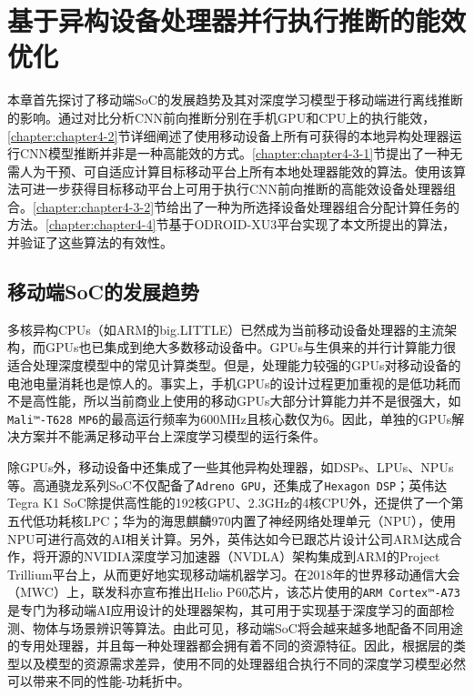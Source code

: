 \chapter{基于异构设备处理器并行执行推断的能效优化}
\label{chapter:chapter4}

本章首先探讨了移动端SoC的发展趋势及其对深度学习模型于移动端进行离线推断的影响。通过对比分析CNN前向推断分别在手机GPU和CPU上的执行能效，\ref{chapter:chapter4-2}节详细阐述了使用移动设备上所有可获得的本地异构处理器运行CNN模型推断并非是一种高能效的方式。\ref{chapter:chapter4-3-1}节提出了一种无需人为干预、可自适应计算目标移动平台上所有本地处理器能效的算法。使用该算法可进一步获得目标移动平台上可用于执行CNN前向推断的高能效设备处理器组合。\ref{chapter:chapter4-3-2}节给出了一种为所选择设备处理器组合分配计算任务的方法。\ref{chapter:chapter4-4}节基于ODROID-XU3平台实现了本文所提出的算法，并验证了这些算法的有效性。

\section{移动端SoC的发展趋势}
\label{chapter:chapter4-1}
多核异构CPUs（如ARM的big.LITTLE\cite{chung2012heterogeneous}）已然成为当前移动设备处理器的主流架构，而GPUs也已集成到绝大多数移动设备中。GPUs与生俱来的并行计算能力很适合处理深度模型中的常见计算类型。但是，处理能力较强的GPUs对移动设备的电池电量消耗也是惊人的。事实上，手机GPUs的设计过程更加重视的是低功耗而不是高性能，所以当前商业上使用的移动GPUs大部分计算能力并不是很强大，如\texttt{Mali™-T628 MP6}的最高运行频率为600MHz且核心数仅为6。因此，单独的GPUs解决方案并不能满足移动平台上深度学习模型的运行条件。

除GPUs外，移动设备中还集成了一些其他异构处理器，如DSPs、LPUs、NPUs等。高通骁龙系列SoC不仅配备了\texttt{Adreno GPU}，还集成了\texttt{Hexagon DSP}；英伟达Tegra K1 SoC除提供高性能的192核GPU、2.3GHz的4核CPU外，还提供了一个第五代低功耗核LPC；华为的海思麒麟970内置了神经网络处理单元（NPU），使用NPU可进行高效的AI相关计算。另外，英伟达如今已跟芯片设计公司ARM达成合作，将开源的NVIDIA深度学习加速器（NVDLA）架构集成到ARM的Project Trillium平台上，从而更好地实现移动端机器学习。在2018年的世界移动通信大会（MWC）上，联发科亦宣布推出Helio P60芯片，该芯片使用的\texttt{ARM Cortex™-A73}是专门为移动端AI应用设计的处理器架构，其可用于实现基于深度学习的面部检测、物体与场景辨识等算法。由此可见，移动端SoC将会越来越多地配备不同用途的专用处理器，并且每一种处理器都会拥有着不同的资源特征。因此，根据层的类型以及模型的资源需求差异，使用不同的处理器组合执行不同的深度学习模型必然可以带来不同的性能-功耗折中\cite{attia2015dynamic}。

